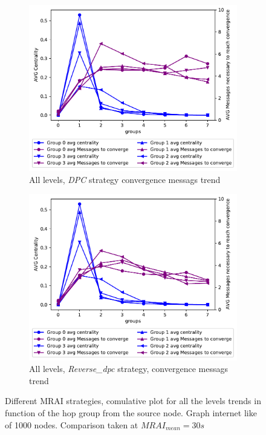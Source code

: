 \documentclass[10pt,conference,letterpaper]{IEEEtran}
\newcommand{\figwidth}{0.78}
\newcommand{\figvspace}{-1.5em}
\begin{document}
\begin{figure}[tb]
	\begin{subfigure}{.49\columnwidth}
		\centering
		\includegraphics[width=\figwidth\columnwidth]{images/different_levels/DPC_all_levels_comparison_centVSmsg.pdf}
		\caption{All levels, \textit{DPC} strategy convergence messags trend}
		\label{fig:1000-dpc-msg-trend-allLevels}
	\end{subfigure}
	\hfill
	\begin{subfigure}{.49\columnwidth}
		\centering
		\includegraphics[width=\figwidth\columnwidth]{images/different_levels/reverse_dpc_all_levels_comparison_centVSmsg.pdf}
		\caption{All levels, \textit{Reverse\_dpc} strategy, convergence messags trend}
		\label{fig:1000-reverse-dpc-msg-trend-allLevels}
	\end{subfigure}

	\caption{Different \ac{MRAI} strategies, comulative plot for all the levels
			 trends in function of the hop group from the source node.
			 Graph internet like of \num{1000} nodes.
			 Comparison taken at $MRAI_{mean} = 30s$}
	\label{fig:1000-dpcVSreverse_levels_all}
	\vspace{\figvspace}
\end{figure}



\end{document}
